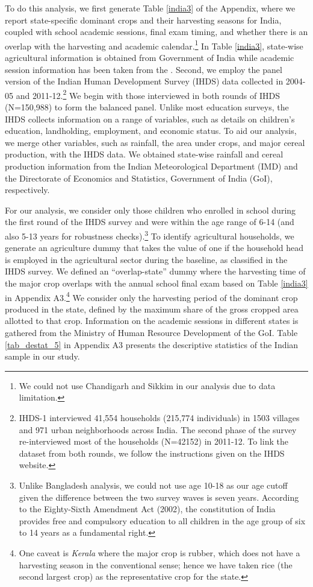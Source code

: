 \documentclass[12pt,letterpaper]{article}
\newcommand{\0}{\ensuremath{\mbox{\boldmath $0$}}}
\begin{document}
To do this analysis, we first generate Table \ref{india3} of the Appendix, where we report state-specific dominant crops and their harvesting seasons for India, coupled with school academic sessions, final exam timing, and whether there is an overlap with the harvesting and academic calendar.\footnote{We could not use Chandigarh and Sikkim in our analysis due to data limitation.} In Table \ref{india3}, state-wise agricultural information is obtained from Government of India \citep{doac2017agricultural} while academic session information has been taken from the \cite{doac2011education}. Second, we employ the panel version of the Indian Human Development Survey (IHDS) data collected in 2004-05 and 2011-12.\footnote{IHDS-1 interviewed 41,554 households (215,774 individuals) in 1503 villages and 971 urban neighborhoods across India. The second phase of the survey re-interviewed most of the households (N=42152) in 2011-12. To link the dataset from both rounds, we follow the instructions given on the IHDS website.} We begin with those interviewed in both rounds of IHDS (N=150,988) to form the balanced panel. Unlike most education surveys, the IHDS collects information on a range of variables, such as details on children's education, landholding, employment, and economic status. To aid our analysis, we merge other variables, such as rainfall, the area under crops, and major cereal production, with the IHDS data. We obtained state-wise rainfall and cereal production information from the Indian Meteorological Department (IMD) and the Directorate of Economics and Statistics, Government of India (GoI), respectively.

For our analysis, we consider only those children who enrolled in school during the first round of the IHDS survey and were within the age range of 6-14 (and also 5-13 years for robustness checks).\footnote{Unlike Bangladesh analysis, we could not use age 10-18 as our age cutoff given the difference between the two survey waves is seven years. According to the Eighty-Sixth Amendment Act (2002), the constitution of India provides free and compulsory education to all children in the age group of six to 14 years as a fundamental right.} To identify agricultural households, we generate an agriculture dummy that takes the value of one if the household head is employed in the agricultural sector during the baseline, as classified in the IHDS survey.  We defined an ``overlap-state'' dummy where the harvesting time of the major crop overlaps with the annual school final exam based on Table \ref{india3} in Appendix A3.\footnote{One caveat is \textit{Kerala} where the major crop is rubber, which does not have a harvesting season in the conventional sense; hence we have taken rice (the second largest crop) as the representative crop for the state.} We consider only the harvesting period of the dominant crop produced in the state, defined by the maximum share of the gross cropped area allotted to that crop. Information on the academic sessions in different states is gathered from the Ministry of Human Resource Development of the GoI. Table \ref{tab_destat_5} in Appendix A3 presents the descriptive statistics of the Indian sample in our study.
\end{document}
